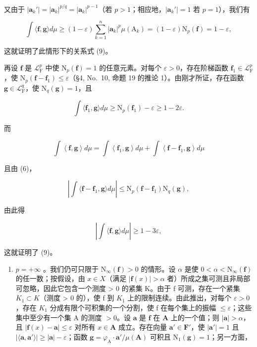 又由于 \(|\mathbf{a}_k'| = |\mathbf{a}_k|^{p / q} = |\mathbf{a}_k|^{p - 1}\)（若 \(p > 1\)；相应地，\(|\mathbf{a}_k'| = 1\) 若 \(p = 1\)），我们有

\[
\int \langle \mathbf {f}, \mathbf {g} \rangle d \mu \geqslant (1 - \varepsilon) \sum_ {k = 1} ^ {n} | \mathbf {a} _ {k} | ^ {p} \mu (\mathrm{A} _ {k}) = (1 - \varepsilon) \mathrm{N} _ {p} (\mathbf {f}) = 1 - \varepsilon ,
\]

这就证明了此情形下的关系式 (9)。

再设 \(\mathbf{f}\) 是 \(\mathcal{L}_{\mathrm{F}}^{p}\) 中使 \(\mathrm{N}_p(\mathbf{f}) = 1\) 的任意元素。对每个 \(\varepsilon > 0\)，存在阶梯函数 \(\mathbf{f}_1 \in \mathcal{L}_{\mathrm{F}}^p\)，使 \(\mathrm{N}_p(\mathbf{f} - \mathbf{f}_1) \leqslant \varepsilon\)（§4, No.~10, 命题 19 的推论 1）。由刚才所证，存在函数 \(\mathbf{g} \in \mathcal{L}_{\mathrm{F}}^q\)，使 \(\mathrm{N}_q(\mathbf{g}) = 1\)，且

\[
\int \langle \mathbf {f} _ {1}, \mathbf {g} \rangle d \mu \geqslant \mathrm{N} _ {p} (\mathbf {f} _ {1}) - \varepsilon \geqslant 1 - 2 \varepsilon .
\]

而

\[
\int \left\langle \mathbf {f}, \mathbf {g} \right\rangle d \mu = \int \left\langle \mathbf {f} _ {1}, \mathbf {g} \right\rangle d \mu + \int \left\langle \mathbf {f} - \mathbf {f} _ {1}, \mathbf {g} \right\rangle d \mu
\]

且由 (6)，

\[
\left| \int \langle \mathbf {f} - \mathbf {f} _ {1}, \mathbf {g} \rangle d \mu \right| \leqslant \mathrm{N} _ {p} (\mathbf {f} - \mathbf {f} _ {1}) \mathrm{N} _ {q} (\mathbf {g}),
\]

由此得

\[
\left| \int \langle \mathbf {f}, \mathbf {g} \rangle d \mu \right| \geqslant 1 - 3 \varepsilon ,
\]

这就证明了 (9)。

\begin{enumerate}
\def\labelenumi{(\roman{enumi})}
\setcounter{enumi}{1}
\tightlist
\item
  \(p = +\infty\) 。我们仍可只限于 \(\mathrm{N}_{\infty}(\mathbf{f}) > 0\) 的情形。设 \(\alpha\) 是使 \(0 < \alpha < \mathrm{N}_{\infty}(\mathbf{f})\) 的任一数；按假设，由 \(x \in X\)（满足 \(|\mathbf{f}(x)| > \alpha\) 者）所成之集可测且非局部可忽略，因此它包含一个测度 \textgreater{} 0 的紧集 K。由于 f 可测，存在一个紧集 \(K_{1} \subset K\)（测度 \textgreater{} 0 的），使 f 到 \(K_{1}\) 上的限制连续。由此推出，对每个 \(\varepsilon > 0\)，存在 \(K_{1}\) 分成有限个可积集的一个分割，使 f 在每个集上的振幅 \(\leqslant \varepsilon\)；这些集中至少有一个集 A 的测度 \(>0\)。设 \(\mathbf{a}\) 是 \(\mathbf{f}\) 在 \(\mathbf{A}\) 上的一个值；则 \(|\mathbf{a}| > \alpha\)，且 \(|\mathbf{f}(x) - \mathbf{a}| \leqslant \varepsilon\) 对所有 \(x \in \mathbf{A}\) 成立。存在向量 \(\mathbf{a}' \in \mathbf{F}'\)，使 \(|\mathbf{a}'| = 1\) 且 \(|\langle \mathbf{a}, \mathbf{a}' \rangle| \geqslant |\mathbf{a}| - \varepsilon\)；函数 \(\mathbf{g} = \varphi_{\mathrm{A}} \cdot \mathbf{a}' / \mu(\mathbf{A})\) 可积且 \(\mathrm{N}_1(\mathbf{g}) = 1\)；另一方面，
\end{enumerate}

